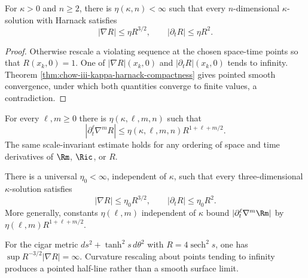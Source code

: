 \begin{theorem}
\label{thm:chow-iii-kappa-scaled-derivative-estimates}
For $\kappa>0$ and $n\ge2$, there is $\eta(\kappa,n)<\infty$ such that every
$n$-dimensional $\kappa$-solution with Harnack satisfies
\[
 |\nabla R|\le\eta R^{3/2},
 \qquad |\partial_tR|\le\eta R^2.
\]
\end{theorem}
\begin{proof}
\sketch Otherwise rescale a violating sequence at the chosen space-time points so
that $R(x_k,0)=1$.  One of $|\nabla R|(x_k,0)$ and
$|\partial_tR|(x_k,0)$ tends to infinity.  Theorem
\ref{thm:chow-iii-kappa-harnack-compactness} gives pointed smooth convergence,
under which both quantities converge to finite values, a contradiction.
\end{proof}

\begin{remark}
\label{rem:chow-iii-kappa-all-derivative-estimates}
For every $\ell,m\ge0$ there is $\eta(\kappa,\ell,m,n)$ such that
\[
 |\partial_t^\ell\nabla^mR|
 \le\eta(\kappa,\ell,m,n)R^{1+\ell+m/2}.
\]
The same scale-invariant estimate holds for any ordering of space and time
derivatives of $\Rm$, $\Ric$, or $R$.
\end{remark}

\begin{corollary}
\label{cor:chow-iii-3d-universal-scaled-derivatives}
There is a universal $\eta_0<\infty$, independent of $\kappa$, such that
every three-dimensional $\kappa$-solution satisfies
\[
 |\nabla R|\le\eta_0R^{3/2},
 \qquad |\partial_tR|\le\eta_0R^2.
\]
More generally, constants $\eta(\ell,m)$ independent of $\kappa$ bound
$|\partial_t^\ell\nabla^m\Rm|$ by
$\eta(\ell,m)R^{1+\ell+m/2}$.
\end{corollary}

\begin{remark}
\label{rem:chow-iii-cigar-scaled-derivative-failure}
For the cigar metric $ds^2+\tanh^2s\,d\theta^2$ with
$R=4\operatorname{sech}^2s$, one has
$\sup R^{-3/2}|\nabla R|=\infty$.  Curvature rescaling about points tending
to infinity produces a pointed half-line rather than a smooth surface limit.
\end{remark}

